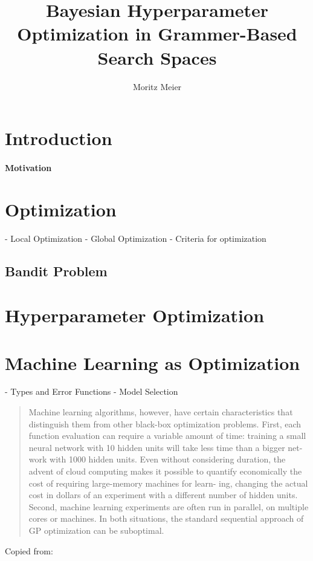 \documentclass[english]{article}
\begin{document}
  

\title{Bayesian Hyperparameter Optimization in Grammer-Based Search Spaces}
\author{Moritz Meier}
\tableofcontents

\section{Introduction}
\paragraph{Motivation}

\section{Optimization}
 - Local Optimization
 - Global Optimization
 - Criteria for optimization

\subsection{Bandit Problem}

\section{Hyperparameter Optimization}

\section{Machine Learning as Optimization}
 - Types and Error Functions
 - Model Selection

\begin{quote}
Machine learning algorithms, however, have certain characteristics that distinguish them from other
black-box optimization problems.  First, each function evaluation can require a variable amount of
time:  training a small neural network with 10 hidden units will take less time than a bigger net-
work with 1000 hidden units.  Even without considering duration, the advent of cloud computing
makes it possible to quantify economically the cost of requiring large-memory machines for learn-
ing, changing the actual cost in dollars of an experiment with a different number of hidden units.
Second, machine learning experiments are often run in parallel, on multiple cores or machines.  In
both situations, the standard sequential approach of GP optimization can be suboptimal.
\end{quote}
Copied from: \cite{snoek_practical_2012}
\end{document}
